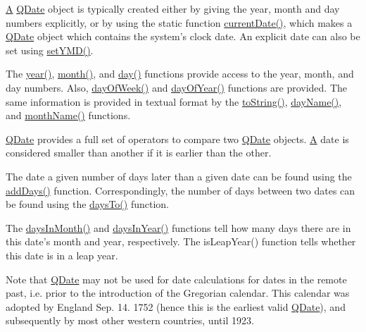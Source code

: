 \hyperlink{class_a}{A} \hyperlink{class_q_date}{Q\-Date} object is typically created either by giving the year, month and day numbers explicitly, or by using the static function \hyperlink{class_q_date_a61ad3df11782433257f49a009a29ac71}{current\-Date()}, which makes a \hyperlink{class_q_date}{Q\-Date} object which contains the system's clock date. An explicit date can also be set using \hyperlink{class_q_date_ad97bdddadf0a00132cf3a1dbd295d5cc}{set\-Y\-M\-D()}.

The \hyperlink{class_q_date_ab30e3b28d52eaa040cf319dd6dc1e540}{year()}, \hyperlink{class_q_date_a355d09d181aac0740f52d4de32ecef28}{month()}, and \hyperlink{class_q_date_a8351735d17aade98a109869520db2654}{day()} functions provide access to the year, month, and day numbers. Also, \hyperlink{class_q_date_a56ec4f975c56ff04a7f82a3c8fd88c7d}{day\-Of\-Week()} and \hyperlink{class_q_date_ac8fc8b70667e887946e43ac2b56c153f}{day\-Of\-Year()} functions are provided. The same information is provided in textual format by the \hyperlink{class_q_date_a8aabbf2e3c7be33fa5769a5eab3eef6f}{to\-String()}, \hyperlink{class_q_date_a573efd9ed94bc7a6f0a99dfa1f832ce1}{day\-Name()}, and \hyperlink{class_q_date_a00c3489f166c84ce1961b77d8e8196a2}{month\-Name()} functions.

\hyperlink{class_q_date}{Q\-Date} provides a full set of operators to compare two \hyperlink{class_q_date}{Q\-Date} objects. \hyperlink{class_a}{A} date is considered smaller than another if it is earlier than the other.

The date a given number of days later than a given date can be found using the \hyperlink{class_q_date_a011673a760ff6b5d46f96b419d133b6a}{add\-Days()} function. Correspondingly, the number of days between two dates can be found using the \hyperlink{class_q_date_ab3ae85ecd83cd1b8ee53616f9918f579}{days\-To()} function.

The \hyperlink{class_q_date_ab7ce9d9c27f9246725d8dc1241f52698}{days\-In\-Month()} and \hyperlink{class_q_date_a114a4088c7d3e46a36a55cbfff4b54b7}{days\-In\-Year()} functions tell how many days there are in this date's month and year, respectively. The is\-Leap\-Year() function tells whether this date is in a leap year.

Note that \hyperlink{class_q_date}{Q\-Date} may not be used for date calculations for dates in the remote past, i.\-e. prior to the introduction of the Gregorian calendar. This calendar was adopted by England Sep. 14. 1752 (hence this is the earliest valid \hyperlink{class_q_date}{Q\-Date}), and subsequently by most other western countries, until 1923.


